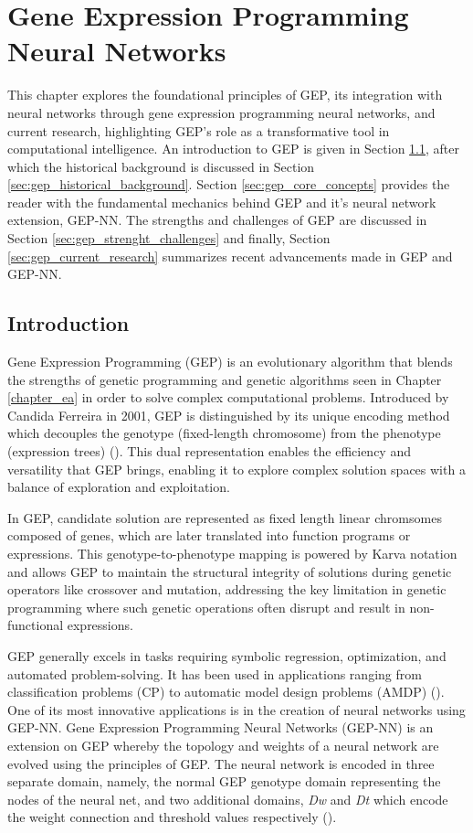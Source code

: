 \chapter{Gene Expression Programming Neural Networks}\label{chapter:gep}
This chapter explores the foundational principles of GEP, its integration with neural networks through gene expression programming neural networks, and current research, highlighting GEP's role as a transformative tool in computational intelligence. An introduction to GEP is given in Section \ref{sec:gep_introduction}, after which the historical background is discussed in Section \ref{sec:gep_historical_background}. Section \ref{sec:gep_core_concepts} provides the reader with the fundamental mechanics behind GEP and it's neural network extension, GEP-NN. The strengths and challenges of GEP are discussed in Section \ref{sec:gep_strenght_challenges} and finally, Section \ref{sec:gep_current_research} summarizes recent advancements made in GEP and GEP-NN.


\section{Introduction}\label{sec:gep_introduction}
Gene Expression Programming (GEP) is an evolutionary algorithm that blends the strengths of genetic programming and genetic algorithms seen in Chapter \ref{chapter_ea} in order to solve complex computational problems. Introduced by Candida Ferreira in 2001, GEP is distinguished by its unique encoding method which decouples the genotype (fixed-length chromosome) from the phenotype (expression trees) (\cite{ferreira2006gene}). This dual representation enables the efficiency and versatility that GEP brings, enabling it to explore complex solution spaces with a balance of exploration and exploitation. \bigskip

\noindent In GEP, candidate solution are represented as fixed length linear chromsomes composed of genes, which are later translated into function programs or expressions. This genotype-to-phenotype mapping is powered by Karva notation and allows GEP to maintain the structural integrity of solutions during  genetic operators like crossover and mutation, addressing the key limitation in genetic programming where such genetic operations often disrupt and result in non-functional expressions. \bigskip

\noindent GEP generally excels in tasks requiring symbolic regression, optimization, and automated problem-solving. It has been used in applications ranging from classification problems (CP) to automatic model design problems (AMDP) (\cite{zhong2017gene}). One of its most innovative applications is in the creation of neural networks using GEP-NN. Gene Expression Programming Neural Networks (GEP-NN) is an extension on GEP whereby the topology and weights of a neural network are evolved using the principles of GEP. The neural network is encoded in three separate domain, namely, the normal GEP genotype domain representing the nodes of the neural net, and two additional domains, \textit{Dw} and \textit{Dt} which encode the weight connection and threshold values respectively (\cite{ferreira2006gene}). \bigskip

